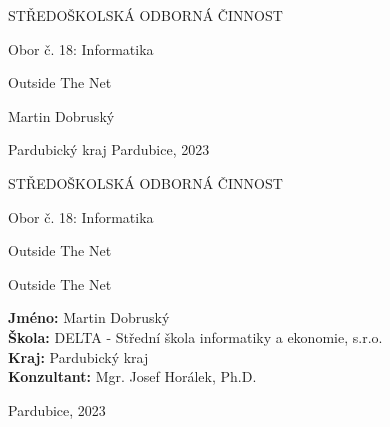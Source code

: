 \documentclass[12pt, a4paper,
 oneside,   
 openright
]{report}
\title{\mainTitle} %
\author{\authorName} %
\date{\publicationYear} %
\newcommand\city{Pardubice} %
\newcommand\district{Pardubický kraj} %
\newcommand\specialization{Obor č. 18: Informatika} %
\newcommand\school{DELTA - Střední škola informatiky a ekonomie, s.r.o.} %
\newcommand\consultant{Mgr. Josef Horálek, Ph.D.} %
\newcommand\authorName{Martin Dobruský}  %
\newcommand\publicationYear{2023} %
\newcommand\mainTitle{Outside The Net} %
\begin{document}
\pagestyle{empty}
\begin{titlepage}
    \bfseries{ %
        \begin{center}
            \LARGE{STŘEDOŠKOLSKÁ ODBORNÁ ČINNOST}

            \vspace{14pt}
            \large{ %
                \specialization
            } %

            \vspace{0.4 \textheight}

            \LARGE{ %
                \mainTitle
            }%

            \vspace{0.4\textheight}
        \end{center}
        
        \noindent\Large{\authorName} 

        \noindent\Large{\district {}  \city, \publicationYear} 
        
            
    } %
\end{titlepage}

\cleardoublepage

{\bfseries %
    \begin{center}
        \LARGE{STŘEDOŠKOLSKÁ ODBORNÁ ČINNOST}

        \vspace{14pt}
        {\large %
            \specialization %
        } %

        \vspace{0.3 \textheight}

        \LARGE{ %
        \mainTitle
        }

        \LARGE{ %
        Outside The Net
        }%

        \vspace{0.24\textheight}
    \end{center}  
}%
{\Large %
    \noindent\textbf{Jméno:} \authorName\\
    \textbf{Škola:} \school\\
    \textbf{Kraj:} \district\\
    \textbf{Konzultant:} \consultant\\
} %

\noindent \city, \publicationYear
\end{document}
